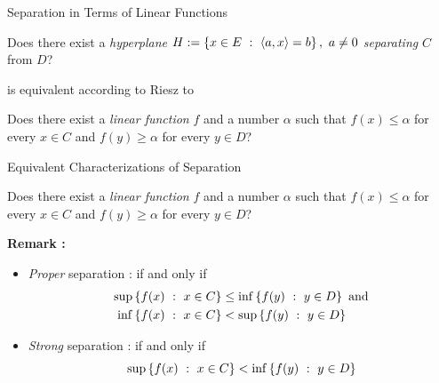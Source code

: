 \documentclass[9pt]{beamer}
\begin{document}
\begin{frame}{Separation in Terms of Linear Functions}

  \begin{tcolorbox}
    Does there exist a \emph{hyperplane}
    \(
    H:=  \left\{ x\in E\ : \ \left<a, x\right>=b \right\},~ a\neq 0
    \)
    \emph{separating} $C$ from $D$?
  \end{tcolorbox}

  is equivalent according to Riesz to

  \begin{tcolorbox}
    Does there exist a \emph{linear function} $f$ and a number $\alpha$ such that 
    $f(x) \leq \alpha$ for every $x\in C$ and $f(y)\geq \alpha$ for every $y \in D$?    
  \end{tcolorbox}

  \vfill
\end{frame}

\begin{frame}{Equivalent Characterizations of Separation}

  \begin{tcolorbox}
    Does there exist a \emph{linear function} $f$ and a number $\alpha$ such that $f(x) \leq \alpha$ for every $x\in C$ and $f(y)\geq \alpha$ for every $y\in D$?    
  \end{tcolorbox}

  \vfill
  \textbf{Remark :}  
  \begin{itemize}
  \item \emph{Proper} separation : if and only if
    \begin{align*}
      \sup \left\{ f(x)\ : \ x\in C \right\} & \leq \inf \left\{ f(y)\ : \ y\in D \right\}~\mathrm{and}\\
      \inf \left\{ f(x)\ : \ x\in C \right\} & < \sup \left\{ f(y)\ : \ y\in D \right\}
    \end{align*}
    
  \item \emph{Strong} separation : if and only if
    \[
            \sup \left\{ f(x)\ : \ x\in C \right\} < \inf \left\{ f(y)\ : \ y\in D \right\}
    \]
  \end{itemize}

\end{frame}
\end{document}
